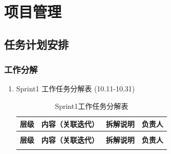 \chapter{项目管理}


\section{任务计划安排}

\subsection{工作分解}

\begin{enumerate}
    \item Sprint1 工作任务分解表 (10.11-10.31)

          \begin{longtable}{>{\centering\arraybackslash}m{2cm} >{\centering\arraybackslash}m{5cm} >{\centering\arraybackslash}m{5cm} >{\centering\arraybackslash}m{1.5cm}}

              \caption{Sprint1工作任务分解表} \label{tab:training}                                                             \\

              \toprule
              \textbf{层级}        & \textbf{内容（关联迭代）}                  & \textbf{拆解说明}                    & \textbf{负责人} \\
              \midrule
              \endfirsthead

              \multicolumn{4}{c}{{\tablename\ \thetable{} 续表}}                                                          \\
              \toprule
              \textbf{层级}        & \textbf{内容（关联迭代）}                  & \textbf{拆解说明}                    & \textbf{负责人} \\
              \midrule
              \endhead

              \bottomrule
              \endfoot



\end{longtable}
\end{enumerate}
